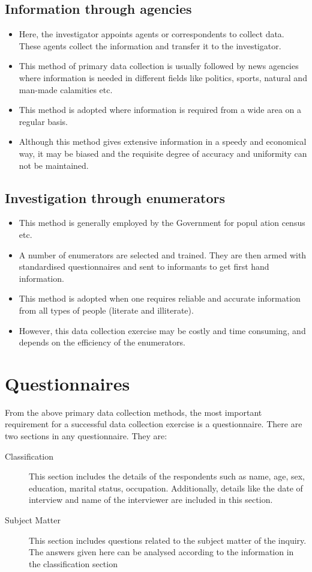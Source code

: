 \documentclass[
10pt, %
a4paper, %
]{report}
\begin{document}
\subsection*{Information through agencies}
\begin{itemize}
\item  Here, the investigator appoints agents or correspondents to collect data. These agents collect the information and transfer it to the investigator.
\item This method of primary data collection is usually followed by
news agencies where information is needed in different fields like
politics, sports, natural and man-made calamities etc.
\item This method is adopted where information is required from a
wide area on a regular basis.
\item Although this method gives extensive information in a speedy and economical way, it may be biased and the requisite degree of accuracy and uniformity can not be maintained.
\end{itemize}
\subsection*{Investigation through enumerators}
\begin{itemize}
\item This method is generally employed by the Government for popul
ation census etc.
\item A number of enumerators are selected and trained. They are then armed with standardised questionnaires and sent to informants to get first hand information.
\item This method is adopted when one requires reliable and accurate
information from all types of people (literate and illiterate).
\item However, this data collection exercise may be costly and time
consuming, and depends on the efficiency of the enumerators.
\end{itemize}

\section*{Questionnaires}
From the above primary data collection methods, the most important
requirement for a successful data collection exercise is a questionnaire. There are two sections in any questionnaire. They are:
\begin{description}
\item[Classification] This section includes the details of the respondents such as name, age, sex, education, marital status, occupation. Additionally, details like the date of interview and name of the interviewer are included in this section.
\item[Subject Matter] This section includes questions related to the subject matter of the inquiry. The answers given here can be analysed according to the information in the classification section
\end{description}
\end{document}
